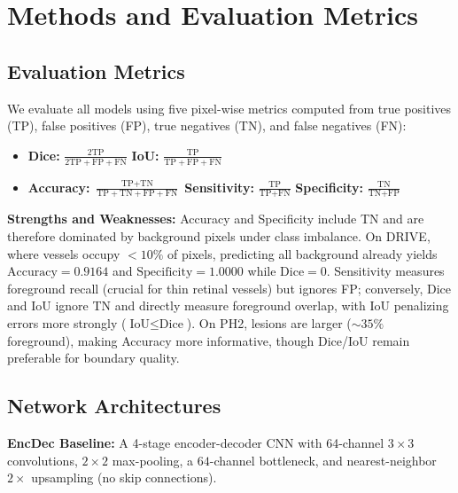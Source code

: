 \section{Methods and Evaluation Metrics}
\label{sec:methods}

\subsection{Evaluation Metrics}
We evaluate all models using five pixel-wise metrics computed from true positives (TP), false positives (FP), true negatives (TN), and false negatives (FN):
\begin{itemize}
    \item \textbf{Dice:} $\frac{2\text{TP}}{2\text{TP}+\text{FP}+\text{FN}}$ \quad \textbf{IoU:} $\frac{\text{TP}}{\text{TP}+\text{FP}+\text{FN}}$
    \item \textbf{Accuracy:} $\frac{\text{TP}+\text{TN}}{\text{TP}+\text{TN}+\text{FP}+\text{FN}}$ \quad \textbf{Sensitivity:} $\frac{\text{TP}}{\text{TP}+\text{FN}}$ \quad \textbf{Specificity:} $\frac{\text{TN}}{\text{TN}+\text{FP}}$
\end{itemize}
\textbf{Strengths and Weaknesses:} Accuracy and Specificity include TN and are therefore dominated by background pixels under class imbalance. On DRIVE, where vessels occupy $<10\%$ of pixels, predicting all background already yields $\text{Accuracy} = 0.9164$ and $\text{Specificity} = 1.0000$ while $\text{Dice} = 0$. Sensitivity measures foreground recall (crucial for thin retinal vessels) but ignores FP; conversely, Dice and IoU ignore TN and directly measure foreground overlap, with IoU penalizing errors more strongly ($\text{IoU} \le \text{Dice}$). On PH2, lesions are larger ($\sim 35\%$ foreground), making Accuracy more informative, though Dice/IoU remain preferable for boundary quality.

\subsection{Network Architectures}
\textbf{EncDec Baseline:} A 4-stage encoder-decoder CNN with 64-channel $3\times3$ convolutions, $2\times2$ max-pooling, a $64$-channel bottleneck, and nearest-neighbor $2\times$ upsampling (no skip connections).

